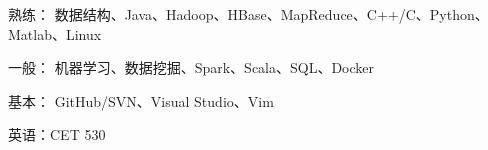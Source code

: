 

\begin{cventries}

  \cventry
    {} %
    {} %
    {} %
    {} %
    {
    	\begin{cvitems} %
	  \item {熟练： 	数据结构、Java、Hadoop、HBase、MapReduce、C++/C、Python、Matlab、Linux}
          \item {一般：	机器学习、数据挖掘、Spark、Scala、SQL、Docker}
          \item{基本：	GitHub/SVN、Visual Studio、Vim}
          \item {英语：CET 530}
        \end{cvitems} 
    }

    

\end{cventries}
